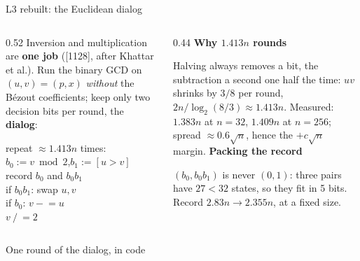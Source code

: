 \documentclass[aspectratio=169,11pt]{beamer}
\newcommand{\blocktitle}[1]{{\bfseries #1}\par\vskip1mm}
\newcommand{\code}[2][]{}
\begin{document}
\begin{frame}{L3 rebuilt: the Euclidean dialog}
  \begin{columns}[T]
    \begin{column}{0.52\textwidth}
      Inversion and multiplication are \textbf{one job} ([1128], after Khattar et al.). Run the binary GCD on $(u,v)=(p,x)$ \emph{without} the Bézout coefficients; keep only two decision bits per round, the \textbf{dialog}:
      \vskip1mm
      \begin{greyblock}[fontupper=\small]
        repeat $\approx1.413n$ times:\\
        \quad $b_0:=v\bmod2$,\quad $b_1:=[u>v]$\\
        \quad record $b_0$ and $b_0b_1$\\
        \quad if $b_0b_1$: swap $u,v$\\
        \quad if $b_0$: $v\mathrel{-}=u$\\
        \quad $v\mathrel{/}=2$
      \end{greyblock}
    \end{column}
    \begin{column}{0.44\textwidth}
      \small
      \blocktitle{Why $1.413n$ rounds}
      Halving always removes a bit, the subtraction a second one half the time: $uv$ shrinks by $3/8$ per round, $2n/\log_2(8/3)\approx1.413n$. Measured: $1.383n$ at $n=32$, $1.409n$ at $n=256$; spread $\approx0.6\sqrt n$, hence the $+c\sqrt n$ margin.
      \vskip2mm
      \blocktitle{Packing the record}
      $(b_0,b_0b_1)$ is never $(0,1)$: three pairs have $27<32$ states, so they fit in 5 bits. Record $2.83n\to2.355n$, at a fixed size.
    \end{column}
  \end{columns}
\end{frame}

\begin{frame}[fragile]{One round of the dialog, in code}
  \code[basicstyle=\ttfamily\fontsize{7.6}{8.8}\selectfont]{dialog_round.py}
\end{frame}
\end{document}
